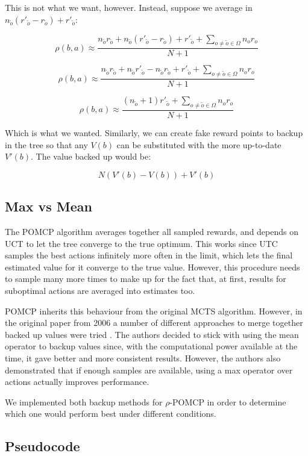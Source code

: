 This is not what we want, however. Instead, suppose we average in $n_{\tilde{o}}(r'_{\tilde{o}} -
r_{\tilde{o}}) + r'_{\tilde{o}}$:

\[ \rho(b,a) \approx \frac{ n_{\tilde{o}} r_{\tilde{o}} + n_{\tilde{o}}(r'_{\tilde{o}} -
r_{\tilde{o}}) + r'_{\tilde{o}} +
\sum_{o \neq \tilde{o} \in \Omega} n_o r_o}{N+1} \]

\[ \rho(b,a) \approx \frac{ n_{\tilde{o}} r_{\tilde{o}} + n_{\tilde{o}}r'_{\tilde{o}} -
        n_{\tilde{o}} r_{\tilde{o}} + r'_{\tilde{o}} +
\sum_{o \neq \tilde{o} \in \Omega} n_o r_o}{N+1} \]

\[ \rho(b,a) \approx \frac{ ( n_{\tilde{o}}+1) r'_{\tilde{o}} +
\sum_{o \neq \tilde{o} \in \Omega} n_o r_o}{N+1} \]

Which is what we wanted. Similarly, we can create fake reward points to backup in the tree so that
any $V(b)$ can be substituted with the more up-to-date $V'(b)$. The value backed up would be:

\[ N ( V'(b) - V(b) ) + V'(b) \]

\subsection{Max vs Mean}

The POMCP algorithm averages together all sampled rewards, and depends on UCT to let the tree
converge to the true optimum. This works since UTC samples the best actions infinitely more often in
the limit, which lets the final estimated value for it converge to the true value. However, this
procedure needs to sample many more times to make up for the fact that, at first, results for
suboptimal actions are averaged into estimates too.

POMCP inherits this behaviour from the original MCTS algorithm. However, in the original paper from
2006 a number of different approaches to merge together backed up values were tried
\cite{cit:mcts}. The authors decided to stick with using the mean operator to backup values since,
with the computational power available at the time, it gave better and more consistent results.
However, the authors also demonstrated that if enough samples are available, using a max operator
over actions actually improves performance.

We implemented both backup methods for $\rho$-POMCP in order to determine which one would perform
best under different conditions.

\subsection{Pseudocode}

